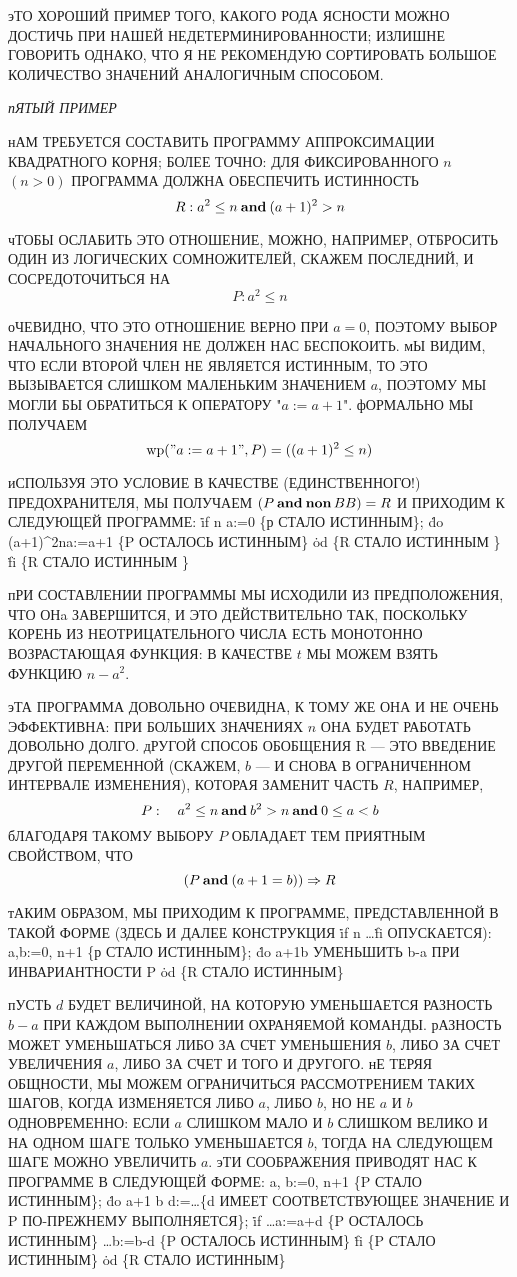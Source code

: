 эТО ХОРОШИЙ ПРИМЕР ТОГО, КАКОГО РОДА ЯСНОСТИ МОЖНО
ДОСТИЧЬ ПРИ НАШЕЙ НЕДЕТЕРМИНИРОВАННОСТИ; ИЗЛИШНЕ ГОВОРИТЬ
ОДНАКО, ЧТО Я НЕ РЕКОМЕНДУЮ СОРТИРОВАТЬ БОЛЬШОЕ 
КОЛИЧЕСТВО ЗНАЧЕНИЙ АНАЛОГИЧНЫМ СПОСОБОМ.

{\sl пЯТЫЙ ПРИМЕР}

нАМ ТРЕБУЕТСЯ СОСТАВИТЬ ПРОГРАММУ АППРОКСИМАЦИИ
КВАДРАТНОГО КОРНЯ; БОЛЕЕ ТОЧНО: ДЛЯ ФИКСИРОВАННОГО $n$ $(n>0)$
ПРОГРАММА ДОЛЖНА ОБЕСПЕЧИТЬ ИСТИННОСТЬ
$$
R:              a^2\le n \and (a+1)^2>n
$$

чТОБЫ ОСЛАБИТЬ ЭТО ОТНОШЕНИЕ, МОЖНО, НАПРИМЕР,
ОТБРОСИТЬ ОДИН ИЗ ЛОГИЧЕСКИХ СОМНОЖИТЕЛЕЙ, СКАЖЕМ ПОСЛЕДНИЙ,
И СОСРЕДОТОЧИТЬСЯ НА
$$
P:                 a^2\le n
$$

оЧЕВИДНО, ЧТО ЭТО ОТНОШЕНИЕ ВЕРНО ПРИ $a=0$, ПОЭТОМУ
ВЫБОР НАЧАЛЬНОГО ЗНАЧЕНИЯ НЕ ДОЛЖЕН НАС БЕСПОКОИТЬ.
мЫ ВИДИМ, ЧТО ЕСЛИ ВТОРОЙ ЧЛЕН НЕ ЯВЛЯЕТСЯ ИСТИННЫМ, ТО ЭТО
ВЫЗЫВАЕТСЯ СЛИШКОМ МАЛЕНЬКИМ ЗНАЧЕНИЕМ $a$, ПОЭТОМУ МЫ МОГЛИ
БЫ ОБРАТИТЬСЯ К ОПЕРАТОРУ "$a:=a+1$". фОРМАЛЬНО МЫ
ПОЛУЧАЕМ
$$
\wp ("a := a + 1 ", P)=((a + 1)^2\le n)
$$

иСПОЛЬЗУЯ ЭТО УСЛОВИЕ В КАЧЕСТВЕ (ЕДИНСТВЕННОГО!)
ПРЕДОХРАНИТЕЛЯ, МЫ ПОЛУЧАЕМ $(P \and \non BB) =R$ И ПРИХОДИМ
К СЛЕДУЮЩЕЙ ПРОГРАММЕ:
\prg
\.{if} n \TO
a:=0  \{р СТАЛО ИСТИННЫМ\};
\.{do} (a+1)^2\LE n\to a:=a+1 \{P ОСТАЛОСЬ ИСТИННЫМ\} \.{od}
\{R СТАЛО ИСТИННЫМ \}
\.{fi} \{R  СТАЛО ИСТИННЫМ \}
\grp

пРИ СОСТАВЛЕНИИ ПРОГРАММЫ МЫ ИСХОДИЛИ ИЗ ПРЕДПОЛОЖЕНИЯ,
ЧТО ОНa ЗАВЕРШИТСЯ, И ЭТО ДЕЙСТВИТЕЛЬНО ТАК, ПОСКОЛЬКУ
КОРЕНЬ ИЗ НЕОТРИЦАТЕЛЬНОГО ЧИСЛА ЕСТЬ МОНОТОННО ВОЗРАСТАЮЩАЯ
ФУНКЦИЯ: В КАЧЕСТВЕ $t$ МЫ МОЖЕМ ВЗЯТЬ ФУНКЦИЮ $n-a^2$.

эТА ПРОГРАММА ДОВОЛЬНО ОЧЕВИДНА, К ТОМУ ЖЕ ОНА И НЕ
ОЧЕНЬ ЭФФЕКТИВНА: ПРИ БОЛЬШИХ ЗНАЧЕНИЯХ $n$ ОНА БУДЕТ РАБОТАТЬ
ДОВОЛЬНО ДОЛГО. дРУГОЙ СПОСОБ ОБОБЩЕНИЯ R --- ЭТО ВВЕДЕНИЕ
ДРУГОЙ ПЕРЕМЕННОЙ (СКАЖЕМ, $b$ --- И СНОВА В ОГРАНИЧЕННОМ
ИНТЕРВАЛЕ ИЗМЕНЕНИЯ), КОТОРАЯ ЗАМЕНИТ ЧАСТЬ $R$, НАПРИМЕР,
$$
P:\quad a^2 \le n \and b^2>n \and 0\le a<b
$$
бЛАГОДАРЯ ТАКОМУ ВЫБОРУ $P$ ОБЛАДАЕТ ТЕМ ПРИЯТНЫМ СВОЙСТВОМ, ЧТО
$$
(P \and (a+1=b))\Rightarrow R
$$

тАКИМ ОБРАЗОМ, МЫ ПРИХОДИМ К ПРОГРАММЕ, ПРЕДСТАВЛЕННОЙ
В ТАКОЙ ФОРМЕ (ЗДЕСЬ И ДАЛЕЕ КОНСТРУКЦИЯ \.{if} n \TO \dots \.{fi}
ОПУСКАЕТСЯ):
\prg
a,b:=0, n+1 \{р СТАЛО ИСТИННЫМ\};
\.{do} a+1\NE b \TO УМЕНЬШИТЬ b-a ПРИ ИНВАРИАНТНОСТИ P \.{od}
\{R СТАЛО ИСТИННЫМ\}
\grp

пУСТЬ $d$ БУДЕТ ВЕЛИЧИНОЙ, НА КОТОРУЮ УМЕНЬШАЕТСЯ РАЗНОСТЬ $b-a$
ПРИ КАЖДОМ ВЫПОЛНЕНИИ ОХРАНЯЕМОЙ КОМАНДЫ.
рАЗНОСТЬ МОЖЕТ УМЕНЬШАТЬСЯ ЛИБО ЗА СЧЕТ УМЕНЬШЕНИЯ $b$,
ЛИБО ЗА СЧЕТ УВЕЛИЧЕНИЯ $a$, ЛИБО ЗА СЧЕТ И ТОГО И ДРУГОГО. нЕ
ТЕРЯЯ ОБЩНОСТИ, МЫ МОЖЕМ ОГРАНИЧИТЬСЯ РАССМОТРЕНИЕМ ТАКИХ
ШАГОВ, КОГДА ИЗМЕНЯЕТСЯ ЛИБО $a$, ЛИБО $b$, НО НЕ $a$ И $b$ ОДНОВРЕМЕННО:
ЕСЛИ $a$ СЛИШКОМ МАЛО И $b$ СЛИШКОМ ВЕЛИКО И НА ОДНОМ ШАГЕ
ТОЛЬКО УМЕНЬШАЕТСЯ $b$, ТОГДА НА СЛЕДУЮЩЕМ ШАГЕ МОЖНО
УВЕЛИЧИТЬ $a$. эТИ СООБРАЖЕНИЯ ПРИВОДЯТ НАС К ПРОГРАММЕ В
СЛЕДУЮЩЕЙ ФОРМЕ:
\prg
a, b:=0, n+1 \{P СТАЛО ИСТИННЫМ\};
\.{do} a+1 \NE b \TO
d:=\dots \{d  ИМЕЕТ СООТВЕТСТВУЮЩЕЕ ЗНАЧЕНИЕ И P ПО-ПРЕЖНЕМУ ВЫПОЛНЯЕТСЯ\};
\.{if} \dots\TO a:=a+d  \{P ОСТАЛОСЬ ИСТИННЫМ\}
\wbox\dots \TO b:=b-d \{P ОСТАЛОСЬ ИСТИННЫМ\}
\.{fi} \{P СТАЛО ИСТИННЫМ\}
\.{od} \{R СТАЛО ИСТИННЫМ\}
\grp

